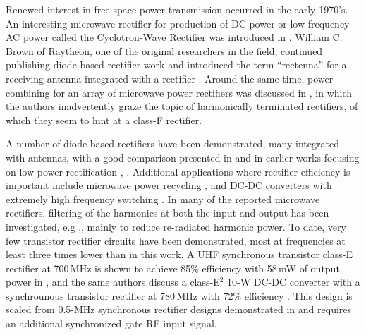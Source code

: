 \documentclass[journal]{IEEEtran}
\begin{document}
Renewed interest in free-space power transmission occurred in the early 1970's. An interesting microwave rectifier for production of DC power or low-frequency AC power called the Cyclotron-Wave Rectifier was introduced in \cite{cyclotron_rect1,cyclotron_rect2}. William C. Brown of Raytheon, one of the original researchers in the field, continued publishing diode-based rectifier work and introduced the term ``rectenna'' for a receiving antenna integrated with a rectifier \cite{brown1_1970,brown3_1970,brown}.  Around the same time,  power combining for an array of microwave power rectifiers was discussed in \cite{rect_power_combine}, in which the authors inadvertently graze the topic of harmonically terminated rectifiers, of which they seem to hint at a class-F rectifier.
\begin{shaded}
A number of diode-based rectifiers have been demonstrated, many integrated with antennas, with a good comparison presented in \cite{erezMTT2012}  and in earlier works focusing on low-power rectification \cite{hagerty}, \cite{erez_thesis}. Additional applications where rectifier efficiency is important include microwave power recycling \cite{asbeck}, and DC-DC converters with extremely high frequency switching \cite{4500dcdc,JoseIMS-rect}. In many of the reported microwave rectifiers, filtering of the harmonics at both the input and output has been investigated, e.g \cite{rectifier_harmonic_generation},\cite{low_cost_rectenna}, mainly to reduce re-radiated harmonic power. To date, very few transistor rectifier circuits have been demonstrated, most at frequencies at least three times lower than in this work.  A UHF synchronous transistor class-E rectifier at 700\,MHz is shown to achieve 85\% efficiency with 58\,mW of output power in \cite{JoseIMS-rect}, and the same authors discuss a class-E$^2$ 10-W DC-DC converter with a synchrounous transistor rectifier at 780\,MHz with 72\% efficiency \cite{Jose-DC-DC-IMS}. This design is scaled from 0.5-MHz synchronous rectifier designs demonstrated in \cite{Kaz} and requires an additional synchronized gate RF input signal.
\end{shaded}
\end{document}
